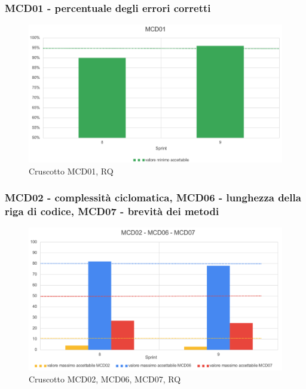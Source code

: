 \subsubsection*{MCD01 - percentuale degli errori corretti}
\begin{figure}[H] 
    \centering
    \includegraphics[scale = 0.55]{immagini/MCD01.png}
    \caption{Cruscotto MCD01, RQ}
\end{figure}

\subsubsection*{MCD02 - complessità ciclomatica, MCD06 - lunghezza della riga di codice, MCD07 - brevità dei metodi}
\begin{figure}[H] 
    \centering
    \includegraphics[scale = 0.55]{immagini/MCD02-06-07.png}
    \caption{Cruscotto MCD02, MCD06, MCD07, RQ}
\end{figure}

